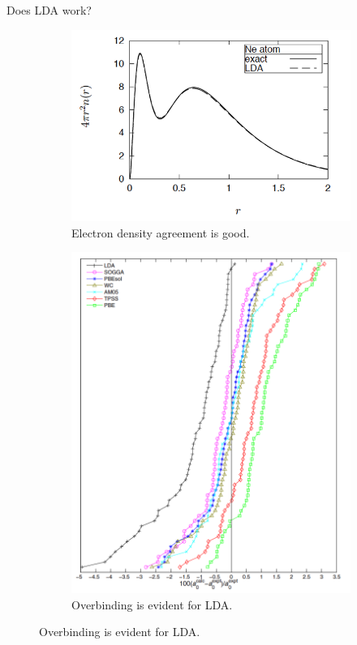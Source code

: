 \documentclass[aspectratio=169]{beamer}
\begin{document}
\begin{frame}{Does LDA work?}

\begin{figure}
    \centering
    \begin{subfigure}{0.6\textwidth}
    \includegraphics[width=\linewidth]{lectures/figures/5_radial_density_Ne.png}
    \caption{Electron density agreement is good.}        
    \end{subfigure}
    \begin{subfigure}{0.35\textwidth}
    \includegraphics[width=\linewidth]{lectures/figures/5_bond_lengths.png}
    \caption{Overbinding is evident for LDA.\cite{haasCalculationLatticeConstant2009}}
    \end{subfigure}
\end{figure}

\end{frame} 
\end{document}
